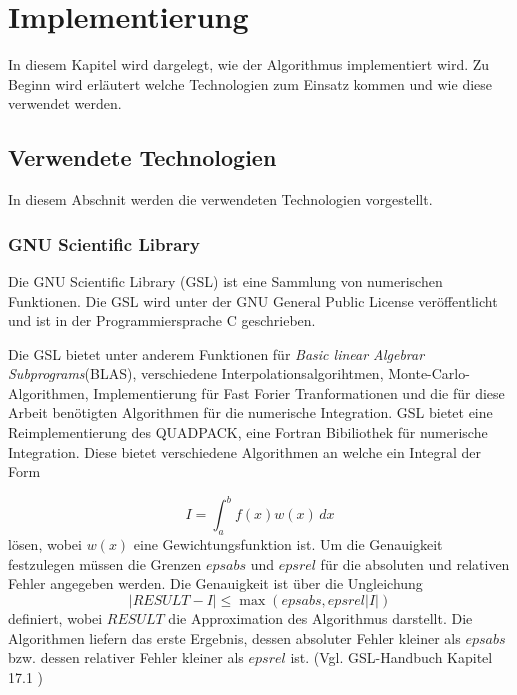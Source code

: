 \chapter{Implementierung}\label{impl}

In diesem Kapitel wird dargelegt, wie der Algorithmus implementiert wird. Zu Beginn wird erläutert welche Technologien zum Einsatz kommen und wie diese verwendet werden.
\section{Verwendete Technologien}

In diesem Abschnit werden die verwendeten Technologien vorgestellt. 


\subsection{GNU Scientific Library}

Die GNU Scientific Library (GSL) ist eine Sammlung von numerischen Funktionen\cite{gsl}. Die GSL wird unter der GNU General Public License veröffentlicht und ist in der Programmiersprache C geschrieben.

Die GSL bietet unter anderem Funktionen für \textit{Basic linear Algebrar Subprograms}(BLAS), verschiedene Interpolationsalgorihtmen, Monte-Carlo-Algorithmen, Implementierung für Fast Forier Tranformationen und die für diese 
Arbeit benötigten Algorithmen für die numerische Integration.
GSL bietet eine Reimplementierung des QUADPACK\cite{quadpack}, eine Fortran Bibiliothek für numerische Integration.
Diese bietet verschiedene Algorithmen an welche ein Integral der Form

\begin{equation*}
    I = \int_{a}^{b} f(x) w(x) \,dx
\end{equation*}
lösen, wobei $w(x)$ eine Gewichtungsfunktion ist. Um die Genauigkeit festzulegen müssen die Grenzen $epsabs$ und $epsrel$ für die absoluten und relativen Fehler angegeben werden.
Die Genauigkeit ist über die Ungleichung 
\begin{equation*}
    |RESULT - I| \leq \max{(epsabs, epsrel |I|)}
\end{equation*}
definiert, wobei $RESULT$ die Approximation des Algorithmus darstellt. Die Algorithmen liefern das erste Ergebnis, dessen absoluter Fehler kleiner als $epsabs$ bzw. dessen relativer Fehler kleiner als $epsrel$ ist. (Vgl. GSL-Handbuch Kapitel 17.1 \cite{gsl})



